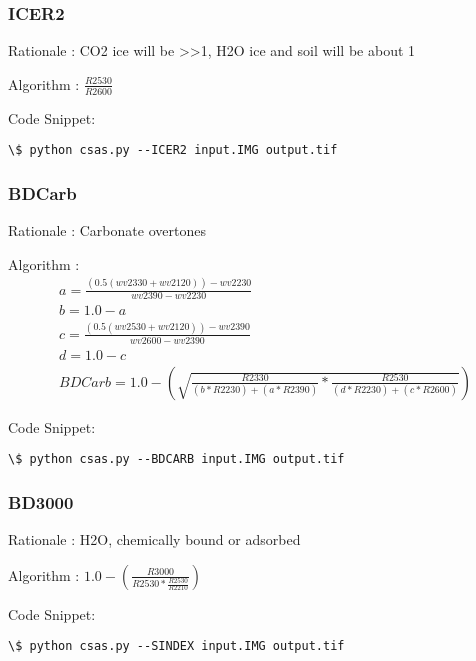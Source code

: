 \documentclass[letterpaper,10pt,english]{sphinxmanual}
\begin{document}
\subsubsection{ICER2}
\label{Algorithms:icer2}
Rationale : CO2 ice will be \textgreater{}\textgreater{}1, H2O ice and soil will be about 1

Algorithm : $\frac{R2530}{R2600}$

Code Snippet:

\begin{Verbatim}[commandchars=\\\{\}]
\$ python csas.py --ICER2 input.IMG output.tif
\end{Verbatim}


\subsubsection{BDCarb}
\label{Algorithms:bdcarb}
Rationale : Carbonate overtones

Algorithm : $$\begin{aligned}
& a = \frac{(0.5(wv2330+wv2120))-wv2230}{wv2390-wv2230}\nonumber\\
& b = 1.0 -a \nonumber\\
& c = \frac{(0.5(wv2530+wv2120))-wv2390}{wv2600-wv2390}\nonumber\\
& d = 1.0 - c\nonumber\\
& BDCarb = 1.0 - (\sqrt{\frac{R2330}{(b*R2230)+(a*R2390)}*\frac{R2530}{(d*R2230)+(c*R2600)}})
\end{aligned}$$

Code Snippet:

\begin{Verbatim}[commandchars=\\\{\}]
\$ python csas.py --BDCARB input.IMG output.tif
\end{Verbatim}


\subsubsection{BD3000}
\label{Algorithms:bd3000}
Rationale : H2O, chemically bound or adsorbed

Algorithm : $1.0 - (\frac{R3000}{R2530 * \frac{R2530}{R2210}})$

Code Snippet:

\begin{Verbatim}[commandchars=\\\{\}]
\$ python csas.py --SINDEX input.IMG output.tif
\end{Verbatim}
\end{document}
